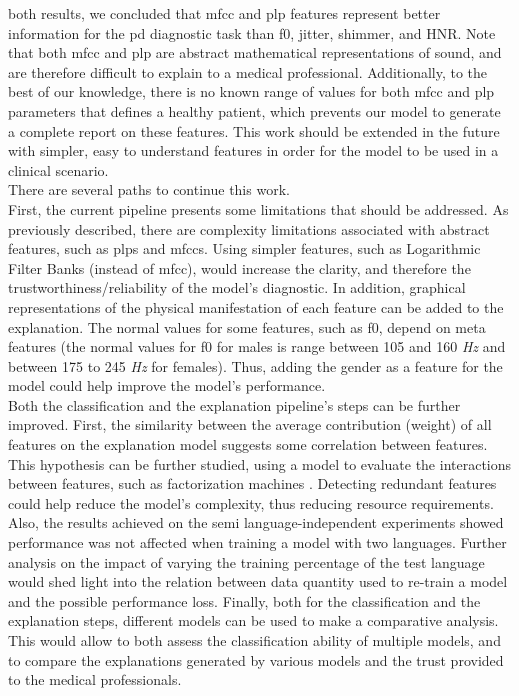 both results, we concluded that \gls{mfcc} and \gls{plp} features represent better information for the \gls{pd} diagnostic task than \gls{f0}, jitter, shimmer, and HNR. Note that both \gls{mfcc} and \gls{plp} are abstract mathematical representations of sound, and are therefore difficult to explain to a medical professional. Additionally, to the best of our knowledge, there is no known range of values for both \gls{mfcc} and \gls{plp} parameters that defines a healthy patient, which prevents our model to generate a complete report on these features. This work should be extended in the future with simpler, easy to understand features in order for the model to be used in a clinical scenario. \\
There are several paths to continue this work. \\
First, the current pipeline presents some limitations that should be addressed. As previously described, there are complexity limitations associated with abstract features, such as \gls{plp}s and \gls{mfcc}s. Using simpler features, such as Logarithmic Filter Banks \cite{logfilterbank} (instead of \gls{mfcc}), would increase the clarity, and therefore the trustworthiness/reliability of the model's diagnostic. In addition, graphical representations of the physical manifestation of each feature can be added to the explanation. The normal values for some features, such as \gls{f0}, depend on meta features (the normal values for \gls{f0} for males is range between 105 and 160 \textit{Hz} and between 175 to 245 \textit{Hz} for females). Thus, adding the gender as a feature for the model could help improve the model's performance. \\
Both the classification and the explanation pipeline's steps can be further improved. First, the similarity between the average contribution (weight) of all features on the explanation model suggests some correlation between features. This hypothesis can be further studied, using a model to evaluate the interactions between features, such as factorization machines \cite{factorizationmachines}. Detecting redundant features could help reduce the model's complexity, thus reducing resource requirements. Also, the results achieved on the semi language-independent experiments showed performance was not affected when training a model with two languages. Further analysis on the impact of varying the training percentage of the test language would shed light into the relation between data quantity used to re-train a model and the possible performance loss. Finally, both for the classification and the explanation steps, different models can be used to make a comparative analysis. This would allow to both assess the classification ability of multiple models, and to compare the explanations generated by various models and the trust provided to the medical professionals. \\
